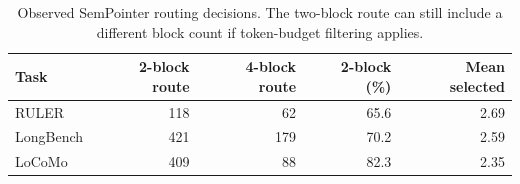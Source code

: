 \begin{table}[t]
\centering
\scriptsize
\setlength{\tabcolsep}{3pt}
\caption{Observed SemPointer routing decisions. The two-block route can still include a different block count if token-budget filtering applies.}
\label{tab:routes}
\begin{tabular}{lrrrr}
\toprule
Task & 2-block route & 4-block route & 2-block (\%) & Mean selected \\
\midrule
RULER & 118 & 62 & 65.6 & 2.69 \\
LongBench & 421 & 179 & 70.2 & 2.59 \\
LoCoMo & 409 & 88 & 82.3 & 2.35 \\
\bottomrule
\end{tabular}
\end{table}
